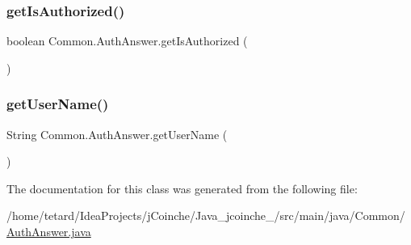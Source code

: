 \subsubsection{\texorpdfstring{get\+Is\+Authorized()}{getIsAuthorized()}}
{\footnotesize\ttfamily boolean Common.\+Auth\+Answer.\+get\+Is\+Authorized (\begin{DoxyParamCaption}{ }\end{DoxyParamCaption})\hspace{0.3cm}{\ttfamily [inline]}}

\mbox{\label{classCommon_1_1AuthAnswer_aa175f09bf18de47d5a75cf88f675a56d}} 
\subsubsection{\texorpdfstring{get\+User\+Name()}{getUserName()}}
{\footnotesize\ttfamily String Common.\+Auth\+Answer.\+get\+User\+Name (\begin{DoxyParamCaption}{ }\end{DoxyParamCaption})\hspace{0.3cm}{\ttfamily [inline]}}



The documentation for this class was generated from the following file\+:\begin{DoxyCompactItemize}
\item 
/home/tetard/\+Idea\+Projects/j\+Coinche/\+Java\+\_\+jcoinche\+\_/src/main/java/\+Common/\mbox{\hyperlink{AuthAnswer_8java}{Auth\+Answer.\+java}}\end{DoxyCompactItemize}

